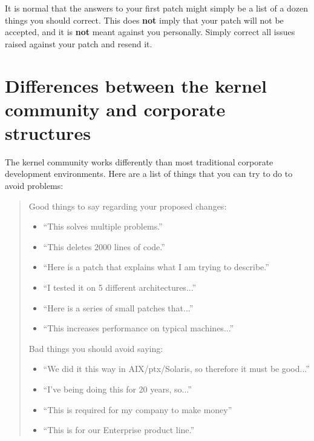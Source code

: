 \documentclass[a4paper,8pt,english]{sphinxmanual}
\begin{document}
It is normal that the answers to your first patch might simply be a list
of a dozen things you should correct.  This does \textbf{not} imply that your
patch will not be accepted, and it is \textbf{not} meant against you
personally.  Simply correct all issues raised against your patch and
resend it.


\section{Differences between the kernel community and corporate structures}
\label{process/howto:differences-between-the-kernel-community-and-corporate-structures}
The kernel community works differently than most traditional corporate
development environments.  Here are a list of things that you can try to
do to avoid problems:
\begin{quote}

Good things to say regarding your proposed changes:
\begin{itemize}
\item {} 
``This solves multiple problems.''

\item {} 
``This deletes 2000 lines of code.''

\item {} 
``Here is a patch that explains what I am trying to describe.''

\item {} 
``I tested it on 5 different architectures...''

\item {} 
``Here is a series of small patches that...''

\item {} 
``This increases performance on typical machines...''

\end{itemize}

Bad things you should avoid saying:
\begin{itemize}
\item {} 
``We did it this way in AIX/ptx/Solaris, so therefore it must be
good...''

\item {} 
``I've being doing this for 20 years, so...''

\item {} 
``This is required for my company to make money''

\item {} 
``This is for our Enterprise product line.''


\end{itemize}
\end{quote}
\end{document}
